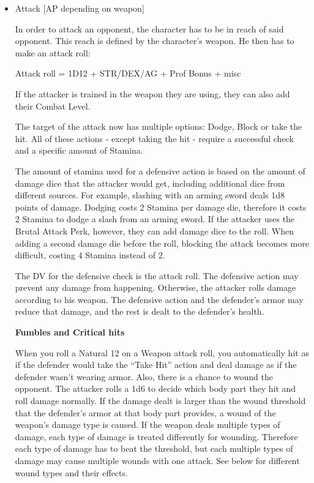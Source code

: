 \begin{itemize}

\item Attack [AP depending on weapon]

In order to attack an opponent, the character has to be in reach of said opponent. This reach is defined by the character’s weapon. He then has to make an attack roll:

Attack roll = 1D12 + STR/DEX/AG + Prof Bonus + misc

If the attacker is trained in the weapon they are using, they can also add their Combat Level.

The target of the attack now has multiple options: Dodge, Block or take the hit. All of these actions - except taking the hit - require a successful check and a specific amount of Stamina.

The amount of stamina used for a defensive action is based on the amount of damage dice that the attacker would get, including additional dice from different sources. For example, slashing with an arming sword deals 1d8 points of damage. Dodging costs 2 Stamina per damage die, therefore it costs 2 Stamina to dodge a slash from an arming sword. If the attacker uses the Brutal Attack Perk, however, they can add damage dice to the roll. When adding a second damage die before the roll, blocking the attack becomes more difficult, costing 4 Stamina instead of 2.

The DV for the defensive check is the attack roll. The defensive action may prevent any damage from happening. Otherwise, the attacker rolls damage according to his weapon. The defensive action and the defender's armor may reduce that damage, and the rest is dealt to the defender’s health.



\textbf{Fumbles and Critical hits}

When you roll a Natural 12 on a Weapon attack roll, you automatically hit as if the defender would take the “Take Hit” action and deal damage as if the defender wasn’t wearing armor. Also, there is a chance to wound the opponent. The attacker rolls a 1d6 to decide which body part they hit and roll damage normally. If the damage dealt is larger than the wound threshold that the defender's armor at that body part provides, a wound of the weapon's damage type is caused. If the weapon deals multiple types of damage, each type of damage is treated differently for wounding. Therefore each type of damage has to beat the threshold, but each multiple types of damage may cause multiple wounds with one attack. See below for different wound types and their effects. 


\end{itemize}

